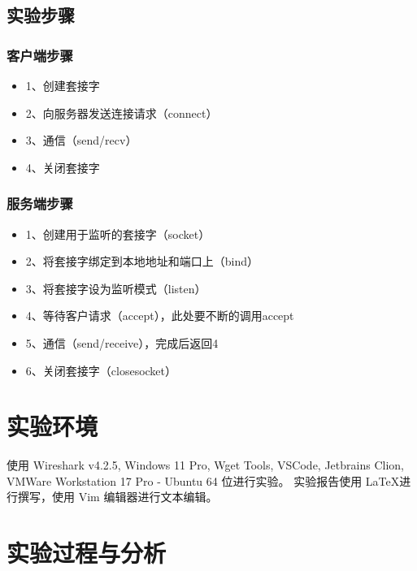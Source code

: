 \documentclass[14pt,a4paper,UTF8,twoside]{article}
\begin{document}
\subsection{实验步骤}

\begin{multicols}{2}

\subsubsection*{客户端步骤}
    \begin{itemize}
        \item 1、创建套接字 
        \item 2、向服务器发送连接请求（connect）
        \item 3、通信（send/recv）
        \item 4、关闭套接字
    \end{itemize}

\columnbreak

\subsubsection*{服务端步骤}
    \begin{itemize}
        \item 1、创建用于监听的套接字（socket）
        \item 2、将套接字绑定到本地地址和端口上（bind）
        \item 3、将套接字设为监听模式（listen）
        \item 4、等待客户请求（accept），此处要不断的调用accept 
        \item 5、通信（send/receive），完成后返回4
        \item 6、关闭套接字（closesocket） 
    \end{itemize}
\end{multicols}

\section{实验环境}

使用 Wireshark v4.2.5, Windows 11 Pro, Wget Tools, VSCode, Jetbrains Clion, VMWare Workstation 17 Pro - Ubuntu 64 位进行实验。
实验报告使用 \LaTeX 进行撰写，使用 Vim 编辑器进行文本编辑。

\section{实验过程与分析}
\end{document}
